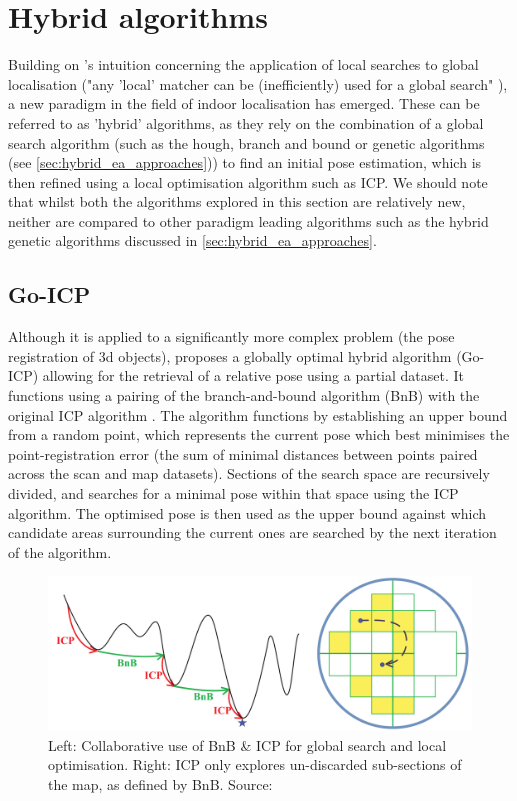 \documentclass[authoryearcitations]{UoYCSproject}
\begin{document}
\section{Hybrid algorithms}
\label{sec:hybrid_approaches}
Building on \citeauthor{Censi2005-iv}'s intuition concerning the application of local searches to global localisation ("any 'local' matcher can be (inefficiently) used for a global search" \cite{Censi2005-iv}), a new paradigm in the field of indoor localisation has emerged. These can be referred to as 'hybrid' algorithms, as they rely on the combination of a global search algorithm (such as the hough, branch and bound or genetic algorithms (see \autoref{sec:hybrid_ea_approaches})) to find an initial pose estimation, which is then refined using a local optimisation algorithm such as ICP. We should note that whilst both the algorithms explored in this section are relatively new, neither are compared to other paradigm leading algorithms such as the hybrid genetic algorithms discussed in \autoref{sec:hybrid_ea_approaches}.

\subsection{Go-ICP}
\label{subsec:go_icp}
Although it is applied to a significantly more complex problem (the pose registration of 3d objects), \citet{Yang2013-gx} proposes a globally optimal hybrid algorithm (Go-ICP) allowing for the retrieval of a relative pose using a partial dataset. It functions using a pairing of the branch-and-bound algorithm (BnB) \cite{Land1960-yw} with the original ICP algorithm \cite{Besl1992-pd}. The algorithm functions by establishing an upper bound from a random point, which represents the current pose which best minimises the point-registration error (the sum of minimal distances between points paired across the scan and map datasets). Sections of the search space are recursively divided, and searches for a minimal pose within that space using the ICP algorithm. The optimised pose is then used as the upper bound against which candidate areas surrounding the current ones are searched by the next iteration of the algorithm. \newline

\begin{figure}[ht]
	\centering
	\includegraphics[width=12cm,keepaspectratio]{images/BnBICP.png}
	\caption[Combining Branch-and-Bound with ICP]{Left: Collaborative use of BnB \& ICP for global search and local optimisation. Right: ICP only explores un-discarded sub-sections of the map, as defined by BnB. Source: \citet{Yang2013-gx}}
	\label{fig:bnb_icp}
\end{figure}
\end{document}
